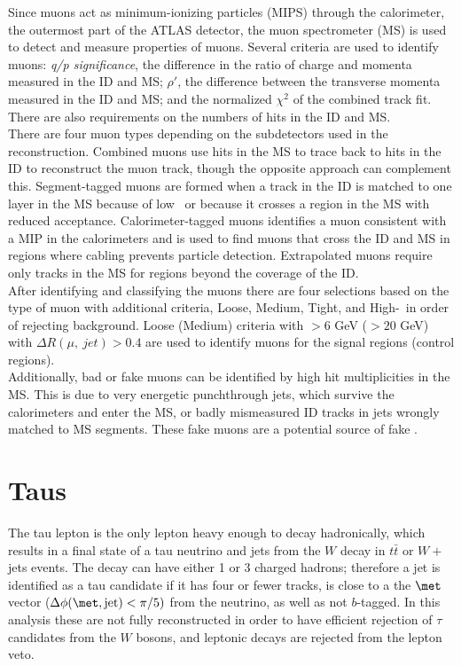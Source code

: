 Since muons act as minimum-ionizing particles (MIPS) through the calorimeter, the outermost part of the ATLAS detector, the muon spectrometer (MS) is used to detect and measure properties of muons.  Several criteria are used to identify muons\cite{PERF-2015-10}: \textit{q/p significance}, the difference in the ratio of charge and momenta measured in the ID and MS; $\rho'$, the difference between the transverse momenta measured in the ID and MS; and the normalized $\chi^2$ of the combined track fit.  There are also requirements on the numbers of hits in the ID and MS. \\

There are four muon types depending on the subdetectors used in the reconstruction.  Combined muons use hits in the MS to trace back to hits in the ID to reconstruct the muon track, though the opposite approach can complement this.  Segment-tagged muons are formed when a track in the ID is matched to one layer in the MS because of low \pt\ or because it crosses a region in the MS with reduced acceptance.  Calorimeter-tagged muons identifies a muon consistent with a MIP in the calorimeters and is used to find muons that cross the ID and MS in regions where cabling prevents particle detection.  Extrapolated muons require only tracks in the MS for regions beyond the coverage of the ID.  \\

After identifying and classifying the muons there are four selections based on the type of muon with additional criteria, Loose, Medium, Tight, and High-\pt\ in order of rejecting background.  Loose (Medium) criteria with \pt$>6$ GeV (\pt$>20$ GeV) with $\Delta R(\mu,\ jet) > 0.4$ are used to identify muons for the signal regions (control regions). \\

Additionally, bad or fake muons can be identified by high hit multiplicities in the MS.  This is due to very energetic punchthrough jets, which survive the calorimeters and enter the MS, or badly mismeasured ID tracks in jets wrongly matched to MS segments.  These fake muons are a potential source of fake \met.

\section{Taus}

The tau lepton is the only lepton heavy enough to decay hadronically, which results in a final state of a tau neutrino and jets from the $W$ decay in $t\bar{t}$ or $W+$jets events.  The decay can have either 1 or 3 charged hadrons; therefore a jet is identified as a tau candidate if it has four or fewer tracks, is close to a the $\met$ vector ($\Delta \phi (\met, \mathrm{jet}) < \pi/5)$ from the neutrino, as well as not $b$-tagged.  In this analysis these are not fully reconstructed in order to have efficient rejection of $\tau$ candidates from the $W$ bosons, and leptonic decays are rejected from the lepton veto. \\



